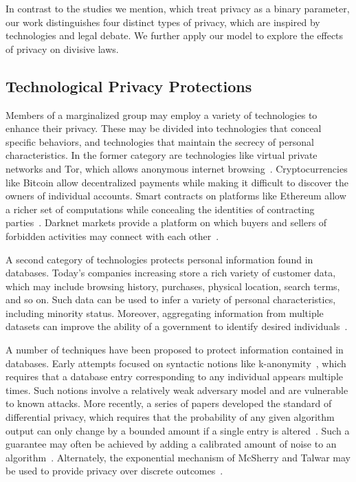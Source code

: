 In contrast to the studies we mention, which treat privacy as a binary parameter, our work distinguishes four distinct types of privacy, which are inspired by technologies and legal debate.  We further apply our model to explore the effects of privacy on divisive laws.

\subsection{Technological Privacy Protections}

Members of a marginalized group may employ a variety of technologies to enhance their privacy.  These may be divided into technologies that conceal specific behaviors, and technologies that maintain the secrecy of personal characteristics.  In the former category are technologies like virtual private networks and Tor, which allows anonymous internet browsing~\cite{dingledine2003privacy}.  Cryptocurrencies like Bitcoin allow decentralized payments while making it difficult to discover the owners of individual accounts.  Smart contracts on platforms like Ethereum allow a richer set of computations while concealing the identities of contracting parties~\cite{buterin2014next}.  Darknet markets provide a platform on which buyers and sellers of forbidden activities may connect with each other~\cite{soska2015measuring}.

A second category of technologies protects personal information found in databases.  Today's companies increasing store a rich variety of customer data, which may include browsing history, purchases, physical location, search terms, and so on.  Such data can be used to infer a variety of personal characteristics, including minority status.  Moreover, aggregating information from multiple datasets can improve the ability of a government to identify desired individuals~\cite{acquisti2009predicting}.

A number of techniques have been proposed to protect information contained in databases.  Early attempts focused on syntactic notions like k-anonymity~\cite{sweeney2002k}, which requires that a database entry corresponding to any individual appears multiple times.  Such notions involve a relatively weak adversary model and are vulnerable to known attacks.  More recently, a series of papers developed the standard of differential privacy, which requires that the probability of any given algorithm output can only change by a bounded amount if a single entry is altered~\cite{dwork2014algorithmic}.  Such a guarantee may often be achieved by adding a calibrated amount of noise to an algorithm~\cite{dwork2006calibrating}.  Alternately, the exponential mechanism of McSherry and Talwar may be used to provide privacy over discrete outcomes~\cite{mcsherry2007mechanism}.

